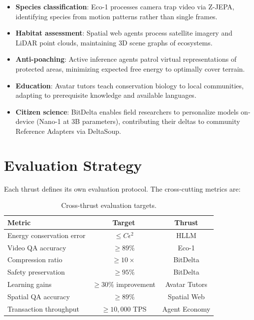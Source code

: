 \documentclass[11pt,letterpaper]{article}
\begin{document}
\begin{itemize}
    \item \textbf{Species classification}: Eco-1 processes camera trap video via Z-JEPA, identifying species from motion patterns rather than single frames.
    \item \textbf{Habitat assessment}: Spatial web agents process satellite imagery and LiDAR point clouds, maintaining 3D scene graphs of ecosystems.
    \item \textbf{Anti-poaching}: Active inference agents patrol virtual representations of protected areas, minimizing expected free energy to optimally cover terrain.
    \item \textbf{Education}: Avatar tutors teach conservation biology to local communities, adapting to prerequisite knowledge and available languages.
    \item \textbf{Citizen science}: BitDelta enables field researchers to personalize models on-device (Nano-1 at 3B parameters), contributing their deltas to community Reference Adapters via DeltaSoup.
\end{itemize}

\section{Evaluation Strategy}

Each thrust defines its own evaluation protocol. The cross-cutting metrics are:

\begin{table}[t]
\centering
\begin{tabular}{lcc}
\toprule
\textbf{Metric} & \textbf{Target} & \textbf{Thrust} \\
\midrule
Energy conservation error & $\leq C\epsilon^2$ & HLLM \\
Video QA accuracy & $\geq 89\%$ & Eco-1 \\
Compression ratio & $\geq 10\times$ & BitDelta \\
Safety preservation & $\geq 95\%$ & BitDelta \\
Learning gains & $\geq 30\%$ improvement & Avatar Tutors \\
Spatial QA accuracy & $\geq 89\%$ & Spatial Web \\
Transaction throughput & $\geq 10{,}000$ TPS & Agent Economy \\
\bottomrule
\end{tabular}
\caption{Cross-thrust evaluation targets.}
\label{tab:eval}
\end{table}
\end{document}

